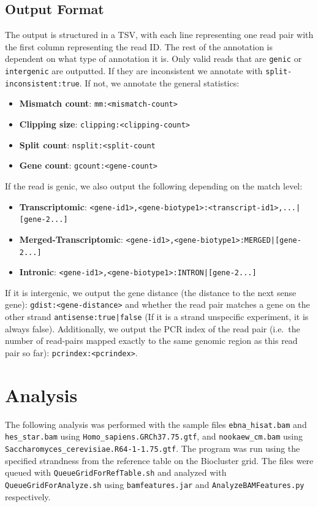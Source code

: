 \documentclass{article}
\begin{document}
    \subsection{Output Format}
    The output is structured in a TSV, with each line representing one read pair with the first column representing the read ID. The rest of the annotation is dependent on what type of annotation it is. Only valid reads that are \texttt{genic} or \texttt{intergenic} are outputted. If they are inconsistent we annotate with \texttt{split-inconsistent:true}. If not, we annotate the general statistics:
    \begin{itemize}
        \item \textbf{Mismatch count}: \texttt{mm:<mismatch-count>}
        \item \textbf{Clipping size}: \texttt{clipping:<clipping-count>}
        \item \textbf{Split count}: \texttt{nsplit:<split-count}
        \item \textbf{Gene count}: \texttt{gcount:<gene-count>}
    \end{itemize}
    If the read is genic, we also output the following depending on the match level:
    \begin{itemize}
        \item \textbf{Transcriptomic}: \texttt{<gene-id1>,<gene-biotype1>:<transcript-id1>,...|[gene-2...]}
        \item \textbf{Merged-Transcriptomic}: \texttt{<gene-id1>,<gene-biotype1>:MERGED|[gene-2...]}
        \item \textbf{Intronic}: \texttt{<gene-id1>,<gene-biotype1>:INTRON|[gene-2...]}
    \end{itemize}
    If it is intergenic, we output the gene distance (the distance to the next sense gene): \texttt{gdist:<gene-distance>} and whether the read pair matches a gene on the other strand \texttt{antisense:true|false} (If it is a strand unspecific experiment, it is always false).
    Additionally, we output the PCR index of the read pair (i.e.\ the number of read-pairs mapped exactly to the same genomic region as this read pair so far): \texttt{pcrindex:<pcrindex>}.


    \section{Analysis}
    The following analysis was performed with the sample files \texttt{ebna\_hisat.bam} and \texttt{hes\_star.bam} using \texttt{Homo\_sapiens.GRCh37.75.gtf}, and \texttt{nookaew\_cm.bam} using \texttt{Saccharomyces\_cerevisiae.R64-1-1.75.gtf}. The program was run using the specified strandness from the reference table on the Biocluster grid. The files were queued with \texttt{QueueGridForRefTable.sh} and analyzed with \texttt{QueueGridForAnalyze.sh} using \texttt{bamfeatures.jar} and \texttt{AnalyzeBAMFeatures.py} respectively.
\end{document}
